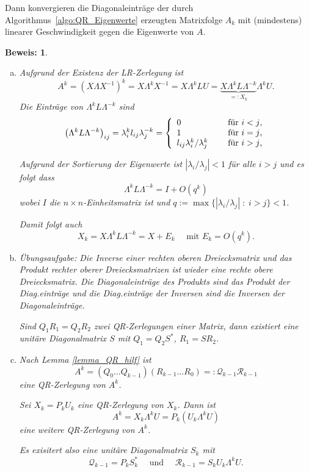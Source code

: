\documentclass[
]{mycourse}
\theoremstyle{mythm}
\theoremstyle{break}
\newtheorem*{beweis}{Beweis:}
\newcommand{\dd}{\; : \;}    			      	%
\newcommand{\labeq}[1]{\label{eq:#1}}			%
\begin{document}
Dann konvergieren die Diagonaleinträge der durch Algorithmus~\ref{algo:QR_Eigenwerte} erzeugten 
Matrixfolge $A_k$ mit (mindestens) linearer Geschwindigkeit gegen die Eigenwerte von $A$.
\begin{beweis}

\begin{enumerate}[(a)]
%
\item Aufgrund der Existenz der LR-Zerlegung ist
\[
A^k=(X\Lambda X^{-1})^k = X \Lambda^k X^{-1}=X\Lambda^k LU = \underbrace{ X  \Lambda^k L \Lambda^{-k}}_{=:X_k} \Lambda^k  U.
\]
Die Einträge von $\Lambda^k L \Lambda^{-k}$ sind 
\[
\left( \Lambda^k L \Lambda^{-k}\right)_{ij}=\lambda_i^k l_{ij} \lambda_j^{-k}
=\left\{ \begin{array}{l l} 0 & \quad \mbox{ für $i<j$,}\\1 & \quad \mbox{ für $i=j$,}\\
l_{ij} \lambda_i^k / \lambda_j^k & \quad \mbox{ für $i>j$,}\end{array}\right.
\]

Aufgrund der Sortierung der Eigenwerte ist $|\lambda_i/\lambda_j|<1$ für alle $i>j$ und es folgt
dass 
\[
\Lambda^k L \Lambda^{-k}=I + O(q^k)
\]
wobei $I$ die $n\times n$-Einheitsmatrix ist und $q:=\max\{ |\lambda_i/\lambda_j| \dd i>j\}<1$. 

Damit folgt auch 
\begin{equation}\labeq{QRKonv_hilf1}
X_k=X\Lambda^k L \Lambda^{-k}=X+E_k \quad \mbox{ mit } E_k=O(q^k).
\end{equation}


\item Übungsaufgabe: Die Inverse einer rechten oberen Dreiecksmatrix und das Produkt rechter oberer Dreiecksmatrizen ist wieder eine rechte obere Dreiecksmatrix. Die Diagonaleinträge des Produkts sind das Produkt der Diag.einträge und die Diag.einträge der Inversen sind die Inversen der Diagonaleinträge. 

Sind $Q_1 R_1=Q_2 R_2$ zwei QR-Zerlegungen einer Matrix, dann existiert eine unitäre Diagonalmatrix $S$ mit
$Q_1=Q_2S^*$, $R_1=SR_2$.
%
\item Nach Lemma \ref{lemma_QR_hilf} ist
\[
A^k= (Q_0 \dots Q_{k-1})(R_{k-1} \dots R_0)=:\mathcal Q_{k-1} \mathcal R_{k-1}
\]
eine QR-Zerlegung von $A^k$.

Sei $X_k=P_k U_k$ eine QR-Zerlegung von $X_k$. Dann ist
\[
A^k=X_k \Lambda^k U= P_k (U_k \Lambda^k U)
\]
eine weitere QR-Zerlegung von $A^k$.

Es exisitert also eine unitäre Diagonalmatrix $S_k$ mit
\[
\mathcal Q_{k-1}=P_k S_k^* \quad \mbox{ und } \quad \mathcal R_{k-1}=S_k U_k \Lambda^k U.
\]


\end{enumerate}
\end{beweis}
\end{document}

